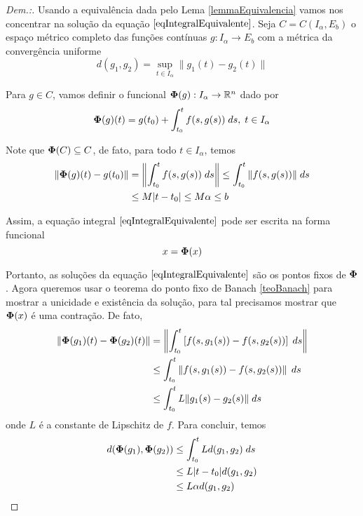 \begin{proof}[Dem.:] 
    Usando a equivalência dada pelo Lema \ref{lemmaEquivalencia} vamos nos concentrar na solução da equação $\eqref{eqIntegralEquivalente}$. Seja $C = C(I_\alpha,E_b)$ o espaço métrico completo das funções contínuas $g:I_\alpha\to E_b$ com a métrica da convergência uniforme
    \begin{equation}
        d(g_1,g_2)=\sup_{t\in I_\alpha} \|g_1(t)-g_2(t)\|
    \end{equation}
    
    Para $g\in C$, vamos definir o funcional $\boldsymbol{\Phi}(g):I_\alpha\to\mathbb{R}^n$ dado por
    \begin{equation}
        \boldsymbol{\Phi}(g)(t)=g(t_0)+\int_{t_0}^t f(s,g(s)) \; ds,\; t\in I_\alpha
    \end{equation}
    
    Note que $\boldsymbol{\Phi}(C)\subseteq C$, de fato, para todo $t\in I_\alpha$, temos
    \begin{equation}
    \begin{split}
        \|\boldsymbol{\Phi}(g)(t)-g(t_0)\| &= \left\|\int_{t_0}^t f(s,g(s))\;ds \right\| \leq \int_{t_0}^t \|f(s,g(s))\|\;ds \\ & \leq M|t-t_0|\leq M\alpha \leq b
    \end{split}
    \end{equation}
    
    Assim, a equação integral $\eqref{eqIntegralEquivalente}$ pode ser escrita na forma funcional
    \begin{equation}
        x = \boldsymbol{\Phi}(x)
    \end{equation}
    
    Portanto, as soluções da equação $\eqref{eqIntegralEquivalente}$ são os pontos fixos de $\boldsymbol{\Phi}$. Agora queremos usar o teorema do ponto fixo de Banach \ref{teoBanach} para mostrar a unicidade e existência da solução, para tal precisamos mostrar que $\boldsymbol{\Phi}(x)$ é uma contração. De fato,
    \begin{equation}
    \begin{split}
        \|\boldsymbol{\Phi}(g_1)(t) - \boldsymbol{\Phi}(g_2)(t)\| &= \left\|\int_{t_0}^t \left[f(s,g_1(s)) - f(s,g_2(s))\right] \; ds \right\|\\ &\leq \int_{t_0}^t \left\|f(s,g_1(s)) - f(s,g_2(s))\right\| \; ds \\ 
        &\leq \int_{t_0}^t L \|g_1(s)-g_2(s)\| \; ds
    \end{split}
    \end{equation}
    onde $L$ é a constante de Lipschitz de $f$. Para concluir, temos
    \begin{equation}
    \begin{split}
        d(\boldsymbol{\Phi}(g_1), \boldsymbol{\Phi}(g_2)) &\leq \int_{t_0}^t Ld(g_1,g_2) \; ds \\ &\leq L|t-t_0|d(g_1,g_2) \\ &\leq L\alpha d(g_1,g_2)
    \end{split}
    \end{equation}
    

\end{proof}
